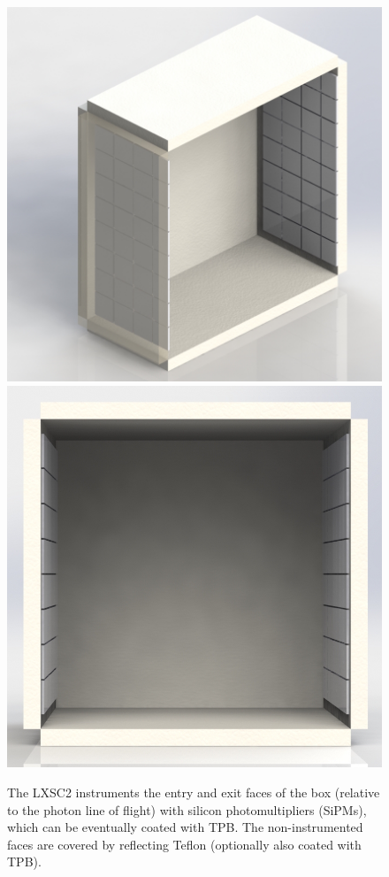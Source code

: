 \documentclass[review]{elsarticle}
\begin{document}
\begin{figure}[!htbp]
	\centering
	\includegraphics[scale=0.20]{../img/Box_2facces_1.jpg}
	\includegraphics[scale=0.20]{../img/Box_2facces_3.jpg}
	\caption{The LXSC2 instruments the entry and exit faces of the box (relative to the photon line of flight) with silicon photomultipliers (SiPMs), which can be eventually coated with TPB. The non-instrumented faces are covered by reflecting Teflon (optionally also coated with TPB).}\label{fig.box} 
\end{figure}
\end{document}
